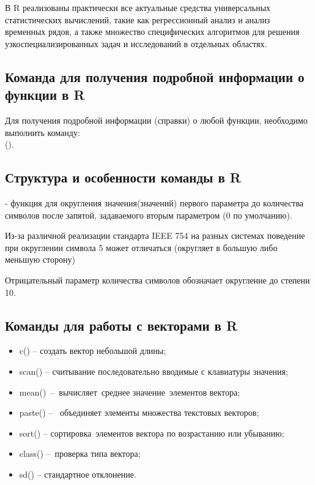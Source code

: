 \documentclass[a4paper,14pt]{extarticle}
\begin{document}
В R реализованы практически все актуальные средства универсальных
статистических вычислений, такие как регрессионный анализ и анализ временных
рядов, а также множество специфических алгоритмов для решения
узкоспециализированных задач и исследований в отдельных областях.

\subsection{Команда для получения подробной информации о функции в R}
Для получения подробной информации (справки) о любой функции, необходимо
выполнить команду: \\  ().

\subsection{Структура и особенности команды  в R}  - функция для округления значения(значений) первого параметра до
количества символов после запятой, задаваемого вторым параметром (0 по умолчанию).

Из-за различной реализации стандарта IEEE 754 на разных системах поведение
 при округлении символа 5 может отличаться (округляет в большую
либо меньшую сторону)

Отрицательный параметр количества символов обозначает округление до степени 10.

\subsection{Команды для работы с векторами в R}
\begin{itemize}
    \item c() – создать вектор небольшой длины;
    \item scan() – считывание последовательно вводимые с клавиатуры значения;
    \item mean() – вычисляет среднее значение элементов вектора;
    \item paste() –  объединяет элементы множества текстовых векторов;
    \item sort() – сортировка элементов вектора по возрастанию или убыванию;
    \item class() – проверка типа вектора;
    \item sd() – стандартное отклонение.
\end{itemize}
\end{document}
